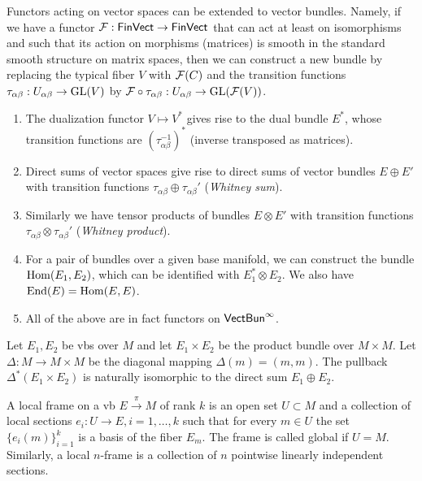 \begin{defn}\label{functors VB}
    Functors acting on vector spaces can be extended to vector bundles. Namely, if we have a functor $\mathcal{F} :\mathsf{FinVect}\to\mathsf{FinVect}$ that can act at least on isomorphisms and such that its action on morphisms (matrices) is smooth in the standard smooth structure on matrix spaces, then we can construct a new bundle by replacing the typical fiber $V$ with $\mathcal{F}(C)$ and the transition functions $\tau_{\alpha\beta}:U_{\alpha\beta}\to \operatorname{GL}(V)$ by $\mathcal{F}\circ \tau_{\alpha\beta}:U_{\alpha\beta}\to \operatorname{GL}(\mathcal{F} (V))$.
    \begin{enumerate}
        \item The dualization functor $V\mapsto V^\ast$ gives rise to the dual bundle $E^\ast$, whose transition functions are $(\tau_{\alpha\beta}^{-1})^\ast$ (inverse transposed as matrices).
        \item Direct sums of vector spaces give rise to direct sums of vector bundles $E\oplus E'$ with transition functions $\tau_{\alpha\beta}\oplus \tau_{\alpha\beta}'$ (\emph{Whitney sum}).
        \item Similarly we have tensor products of bundles $E\otimes E'$ with transition functions $\tau_{\alpha\beta}\otimes \tau_{\alpha\beta}'$ (\emph{Whitney product}).
        \item For a pair of bundles over a given base manifold, we can construct the bundle $\operatorname{Hom}(E_1,E_2)$, which can be identified with $E_1^\ast\otimes E_2$. We also have $\operatorname{End}(E)=\operatorname{Hom}(E,E)$.
        \item All of the above are in fact functors on $\mathsf{VectBun}^\infty$.
    \end{enumerate}
\end{defn}


\begin{example}
    Let $E_1,E_2$ be \glspl{vb} over $M$ and let $E_1\times E_2$ be the product bundle over $M\times M$. Let $\Delta:M\to M\times M$ be the diagonal mapping $\Delta(m)=(m,m)$. The pullback $\Delta^\ast(E_1\times E_2)$ is naturally isomorphic to the direct sum $E_1\oplus E_2$.
\end{example}


    
\begin{defn}[Frames]
    A local frame on a \gls{vb}  $E\overset{\pi}{\to}M$ of rank $k$ is an open set $U\subset M$ and a collection of local sections $e_i:U\to E,i=1,\ldots,k$ such that for every $m\in U$ the set $\{e_i(m)\}_{i=1}^k$ is a basis of the fiber $E_m$. The frame is called global if $U=M$. Similarly, a local $n$-frame is a collection of $n$ pointwise linearly independent sections.
\end{defn}



